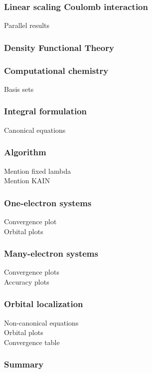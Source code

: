 \documentclass[mathserif]{beamer}
\begin{document}
\begin{frame}
    \frametitle{Linear scaling Coulomb interaction}
    Parallel results
\end{frame}

\begin{frame}
    \frametitle{Density Functional Theory}
\end{frame}

\begin{frame}
    \frametitle{Computational chemistry}
    Basis sets
\end{frame}

\begin{frame}
    \frametitle{Integral formulation}
    Canonical equations
\end{frame}

\begin{frame}
    \frametitle{Algorithm}
    Mention fixed lambda\\
    Mention KAIN
\end{frame}

\begin{frame}
    \frametitle{One-electron systems}
    Convergence plot\\
    Orbital plots
\end{frame}

\begin{frame}
    \frametitle{Many-electron systems}
    Convergence plots\\
    Accuracy plots
\end{frame}

\begin{frame}
    \frametitle{Orbital localization}
    Non-canonical equations\\
    Orbital plots\\
    Convergence table
\end{frame}

\begin{frame}
    \frametitle{Summary}
\end{frame}
\end{document}
